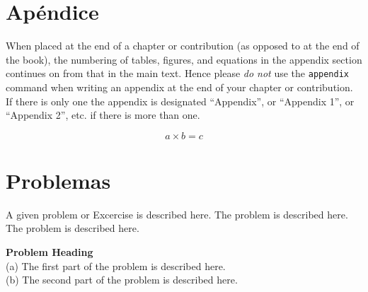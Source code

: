 \section*{Apéndice}
%
When placed at the end of a chapter or contribution (as opposed to at the end of the book), the numbering of tables, figures, and equations in the appendix section continues on from that in the main text. Hence please \textit{do not} use the \verb|appendix| command when writing an appendix at the end of your chapter or contribution. If there is only one the appendix is designated ``Appendix'', or ``Appendix 1'', or ``Appendix 2'', etc. if there is more than one.

\begin{equation}
    a \times b = c
\end{equation}
\section*{Problemas}
%
\begin{prob}
    \label{prob1}
    A given problem or Excercise is described here. The
    problem is described here. The problem is described here.
\end{prob}

\begin{prob}
    \label{prob2}
    \textbf{Problem Heading}\\
    (a) The first part of the problem is described here.\\
    (b) The second part of the problem is described here.
\end{prob}



